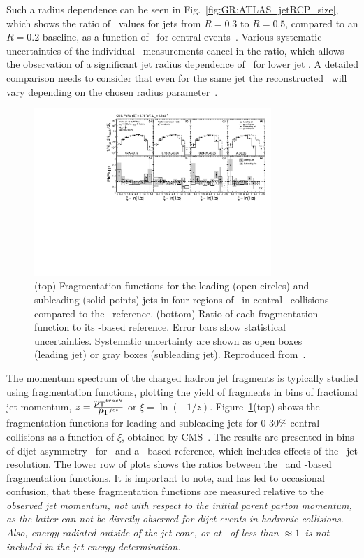 Such a radius dependence can be seen in Fig.~\ref{fig:GR:ATLAS_jetRCP_size}, which
shows the ratio of \Rcp\ values for jets from $R=0.3$ to $R=0.5$, compared
to an $R = 0.2$ baseline, as a function of \pT\ for central events~\cite{Aad:2012is}.
Various systematic uncertainties of the individual \Rcp\ measurements 
cancel in the ratio, which allows the observation of a significant jet radius 
dependence of \Rcp\ for lower jet \pT. A detailed comparison needs to consider 
that even for the same jet the reconstructed \pT\ will vary 
depending on the chosen radius parameter~\cite{Aad:2012is}.


\begin{figure}[!ht]
\begin{center}
\includegraphics[width=0.8\textwidth]{jetfigures/xsi_div_both_effv9_l100s40_0to12_dphi20eta20dr3pt4id1_cwt_ppDiv_gray.pdf}
\caption{(top) Fragmentation functions for the leading (open circles) and subleading (solid points) 
jets in four regions of \AJ\ in central \PbPb\ collisions compared to the \pp\ reference.
(bottom) Ratio of each fragmentation function to its \pp-based reference.
Error bars show statistical uncertainties. Systematic uncertainty are 
shown as open boxes (leading jet) or gray boxes (subleading jet).
Reproduced from~\cite{Chatrchyan:2012gw}.
}

\label{fig:GR:CMS_jetFF}
\end{center}
\end{figure}
The momentum spectrum of the charged hadron jet fragments is typically 
studied using fragmentation functions, plotting the yield of fragments
in bins of fractional jet momentum, $z = \frac{\mbox{$p_{\mathrm{T}}$}^{track}}{\mbox{$p_{\mathrm{T}}$}^{jet}}$ or 
$\xi = \ln(-1/z)$. 
Figure~\ref{fig:GR:CMS_jetFF}(top) shows the fragmentation functions 
for leading and subleading jets for 0-30\% central collisions as a function
of $\xi$, obtained
by CMS~\cite{Chatrchyan:2012gw}. The results are presented in bins of 
dijet asymmetry \AJ\ for \PbPb\ and a \pp\ based reference,
which includes effects of the \PbPb\ jet resolution.
The lower row of plots shows the ratios between the \PbPb\
and \pp-based fragmentation functions. It is important to note, and has 
led to occasional confusion, that these fragmentation functions are 
measured relative to the \em observed \em jet momentum, not with respect
to the initial parent parton momentum, as the latter can not be directly observed
for dijet events in hadronic collisions.
Also, energy radiated outside of the jet cone, or at \pT\ of less than $\approx 1$\GeVc\
is not included in the jet energy determination.

